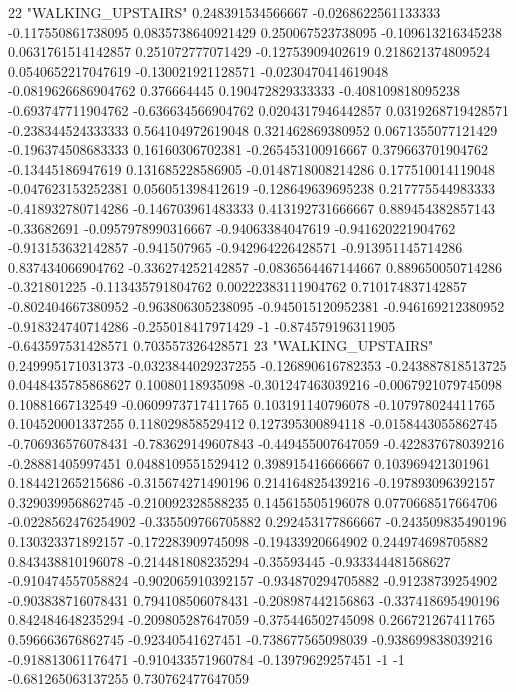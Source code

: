 22 "WALKING_UPSTAIRS" 0.248391534566667 -0.0268622561133333 -0.117550861738095 0.0835738640921429 0.250067523738095 -0.109613216345238 0.0631761514142857 0.251072777071429 -0.12753909402619 0.218621374809524 0.0540652217047619 -0.130021921128571 -0.0230470414619048 -0.0819626686904762 0.376664445 0.190472829333333 -0.408109818095238 -0.693747711904762 -0.636634566904762 0.0204317946442857 0.0319268719428571 -0.238344524333333 0.564104972619048 0.321462869380952 0.0671355077121429 -0.196374508683333 0.16160306702381 -0.265453100916667 0.379663701904762 -0.13445186947619 0.131685228586905 -0.0148718008214286 0.177510014119048 -0.047623153252381 0.056051398412619 -0.128649639695238 0.217775544983333 -0.418932780714286 -0.146703961483333 0.413192731666667 0.889454382857143 -0.33682691 -0.0957978990316667 -0.94063384047619 -0.941620221904762 -0.913153632142857 -0.941507965 -0.942964226428571 -0.913951145714286 0.837434066904762 -0.336274252142857 -0.0836564467144667 0.889650050714286 -0.321801225 -0.113435791804762 0.00222383111904762 0.710174837142857 -0.802404667380952 -0.963806305238095 -0.945015120952381 -0.946169212380952 -0.918324740714286 -0.255018417971429 -1 -0.874579196311905 -0.643597531428571 0.703557326428571
23 "WALKING_UPSTAIRS" 0.249995171031373 -0.0323844029237255 -0.126890616782353 -0.243887818513725 0.0448435785868627 0.10080118935098 -0.301247463039216 -0.0067921079745098 0.10881667132549 -0.0609973717411765 0.103191140796078 -0.107978024411765 0.104520001337255 0.118029858529412 0.127395300894118 -0.0158443055862745 -0.706936576078431 -0.783629149607843 -0.449455007647059 -0.422837678039216 -0.28881405997451 0.0488109551529412 0.398915416666667 0.103969421301961 0.184421265215686 -0.315674271490196 0.214164825439216 -0.197893096392157 0.329039956862745 -0.210092328588235 0.145615505196078 0.0770668517664706 -0.0228562476254902 -0.335509766705882 0.292453177866667 -0.243509835490196 0.130323371892157 -0.172283909745098 -0.19433920664902 0.244974698705882 0.843438810196078 -0.214481808235294 -0.35593445 -0.933344481568627 -0.910474557058824 -0.902065910392157 -0.934870294705882 -0.91238739254902 -0.903838716078431 0.794108506078431 -0.208987442156863 -0.337418695490196 0.842484648235294 -0.209805287647059 -0.375446502745098 0.266721267411765 0.596663676862745 -0.92340541627451 -0.738677565098039 -0.938699838039216 -0.918813061176471 -0.910433571960784 -0.13979629257451 -1 -1 -0.681265063137255 0.730762477647059

